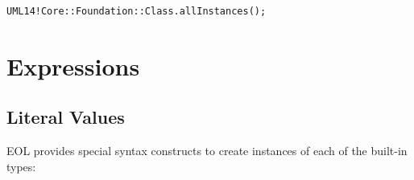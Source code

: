 \begin{lstlisting}[float=tbp, caption=Demonstration of the concrete syntax for accessing model element types, label=lst:ModelElementTypes, language=EOL]
UML14!Core::Foundation::Class.allInstances();
\end{lstlisting}

\section{Expressions}

\subsection{Literal Values}

EOL provides special syntax constructs to create instances of each of the built-in types:

